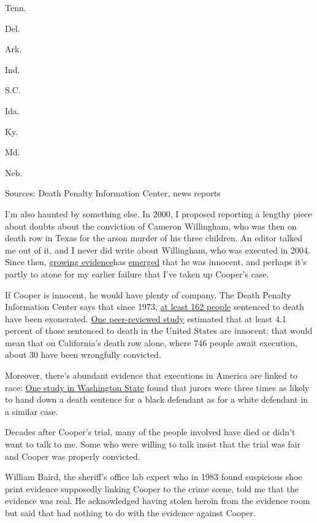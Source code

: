 Tenn.

Del.

Ark.

Ind.

S.C.

Ida.

Ky.

Md.

Neb.

Sources: Death Penalty Information Center, news reports

I'm also haunted by something else. In 2000, I proposed reporting a
lengthy piece about doubts about the conviction of Cameron Willingham,
who was then on death row in Texas for the arson murder of his three
children. An editor talked me out of it, and I never did write about
Willingham, who was executed in 2004. Since then,
\href{https://www.washingtonpost.com/politics/letter-from-witness-casts-further-doubt-on-2004-texas-execution/2015/03/09/d9ebdab8-c451-11e4-ad5c-3b8ce89f1b89_story.html?utm_term=.45bc6814a119}{growing
evidence}has
\href{https://theintercept.com/2017/05/02/texas-prosecutor-in-junk-science-execution-case-stands-trial-for-misconduct/}{emerged}
that he was innocent, and perhaps it's partly to atone for my earlier
failure that I've taken up Cooper's case.

If Cooper is innocent, he would have plenty of company. The Death
Penalty Information Center says that since 1973,
\href{https://deathpenaltyinfo.org/documents/FactSheet.pdf}{at least 162
people} sentenced to death have been exonerated.
\href{http://www.pnas.org/content/111/20/7230}{One peer-reviewed study}
estimated that at least 4.1 percent of those sentenced to death in the
United States are innocent; that would mean that on California's death
row alone, where 746 people await execution, about 30 have been
wrongfully convicted.

Moreover, there's abundant evidence that executions in America are
linked to race:
\href{https://deathpenaltyinfo.org/documents/WashRaceStudy2014.pdf}{One
study in Washington State} found that jurors were three times as likely
to hand down a death sentence for a black defendant as for a white
defendant in a similar case.

Decades after Cooper's trial, many of the people involved have died or
didn't want to talk to me. Some who were willing to talk insist that the
trial was fair and Cooper was properly convicted.

William Baird, the sheriff's office lab expert who in 1983 found
suspicious shoe print evidence supposedly linking Cooper to the crime
scene, told me that the evidence was real. He acknowledged having stolen
heroin from the evidence room but said that had nothing to do with the
evidence against Cooper.

